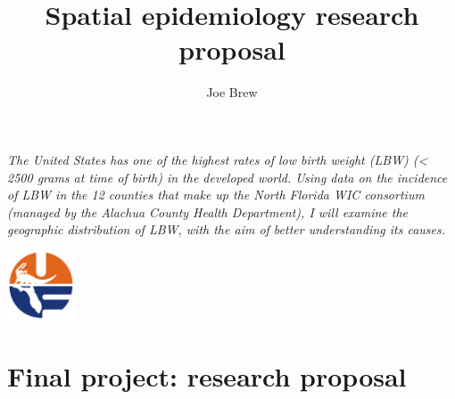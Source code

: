 \documentclass[11pt]{article}
\begin{document}


\title{\textbf{Spatial epidemiology research proposal}}
\author{Joe Brew}


\maketitle

\emph{
The United States has one of the highest rates of low birth weight (LBW) (< 2500 grams at time of birth) in the developed world.  Using data on the incidence of LBW in the 12 counties that make up the North Florida WIC consortium (managed by the Alachua County Health Department), I will examine the geographic distribution of LBW, with the aim of better understanding its causes.
}
\tableofcontents

\vspace{20mm}

\begin{center}
\includegraphics[width=2cm]{uf}
\end{center}


\fancyhfoffset[E,O]{0pt}



\section*{Final project: research proposal}
\hrulefill
\end{document}
